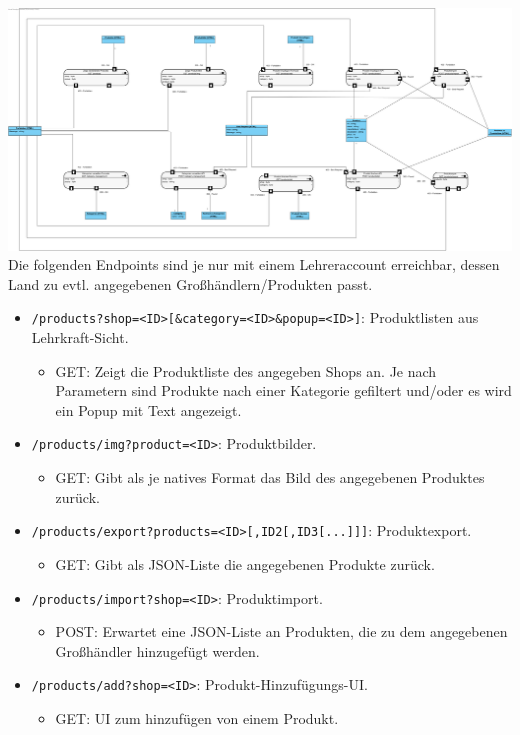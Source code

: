 \includegraphics[width=\textwidth]{img/api-lehrkraft-produkt-kategorie}
Die folgenden Endpoints sind je nur mit einem Lehreraccount erreichbar, dessen Land zu evtl. angegebenen Großhändlern/Produkten passt.
\begin{itemize}
	\item \texttt{/products?shop=<ID>[\&category=<ID>\&popup=<ID>]}: Produktlisten aus Lehrkraft-Sicht.
		\begin{itemize}
			\item GET: Zeigt die Produktliste des angegeben Shops an. Je nach Parametern sind Produkte nach einer Kategorie gefiltert und/oder es wird ein Popup mit Text angezeigt.
		\end{itemize}
	\item \texttt{/products/img?product=<ID>}: Produktbilder.
		\begin{itemize}
			\item GET: Gibt als je natives Format das Bild des angegebenen Produktes zurück.
		\end{itemize}
	\item \texttt{/products/export?products=<ID>[,ID2[,ID3[...]]]}: Produktexport.
		\begin{itemize}
			\item GET: Gibt als JSON-Liste die angegebenen Produkte zurück.
		\end{itemize}
	\item \texttt{/products/import?shop=<ID>}: Produktimport.
		\begin{itemize}
			\item POST: Erwartet eine JSON-Liste an Produkten, die zu dem angegebenen Großhändler hinzugefügt werden.
		\end{itemize}
	\item \texttt{/products/add?shop=<ID>}: Produkt-Hinzufügungs-UI.
		\begin{itemize}
			\item GET: UI zum hinzufügen von einem Produkt.

\end{itemize}
\end{itemize}
